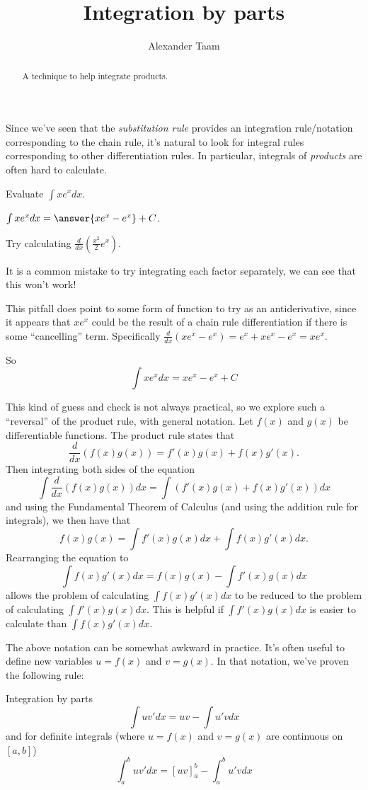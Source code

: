 \documentclass{ximera}
\title{Integration by parts}
\author{Alexander Taam}
\begin{document}
\begin{abstract}
  A technique to help integrate products.
\end{abstract}
\maketitle

Since we've seen that the \emph{substitution rule} provides an integration rule/notation corresponding to the chain rule, it's natural to look for integral rules corresponding to other differentiation rules. In particular, integrals of \emph{products} are often hard to calculate.

\begin{problem}
Evaluate $\int xe^xdx$.

$\int xe^xdx = \answer{xe^x-e^x}+C$.
\begin{hint}
Try calculating $\frac{d}{dx}(\frac{x^2}{2}e^x)$.

It is a common mistake to try integrating each factor separately, we can see that this won't work!
\end{hint}
\begin{explanation}
This pitfall does point to some form of function to try as an antiderivative, since it appears that $xe^x$ could be the result of a chain rule differentiation if there is some ``cancelling'' term. Specifically $\frac{d}{dx}(xe^x-e^x)=e^x+xe^x-e^x=xe^x$. 

So \[\int xe^xdx=xe^x-e^x+C\]
\end{explanation}

\end{problem}


This kind of guess and check is not always practical, so we explore such a ``reversal'' of the product rule, with general notation. Let $f(x)$ and $g(x)$ be differentiable functions. The product rule states that $$\frac{d}{dx}(f(x)g(x))=f'(x)g(x)+f(x)g'(x).$$ Then integrating both sides of the equation
$$\int \frac{d}{dx}(f(x)g(x))dx=\int \left(f'(x)g(x)+f(x)g'(x)\right)dx$$
and using the Fundamental Theorem of Calculus (and using the addition rule for integrals), we then have that 
$$f(x)g(x)=\int f'(x)g(x)dx+\int f(x)g'(x)dx.$$
Rearranging the equation to
$$\int f(x)g'(x)dx=f(x)g(x)-\int f'(x)g(x)dx$$
allows the problem of calculating $\int f(x)g'(x)dx$ to be reduced to the problem of calculating $\int f'(x)g(x)dx$. This is helpful if $\int f'(x)g(x)dx$ is easier to calculate than $\int f(x)g'(x)dx$.

The above notation can be somewhat awkward in practice. It's often useful to define new variables $u=f(x)$ and $v=g(x)$. In that notation, we've proven the following rule:
\begin{theorem}{Integration by parts}\label{int-rule-parts}
$$\int uv'dx=uv-\int u'vdx$$
and for definite integrals (where $u=f(x)$ and $v=g(x)$ are continuous on $[a,b]$)
$$\int_a^b uv'dx=[uv]_a^b-\int_a^b u'vdx$$
\end{theorem}
\end{document}
